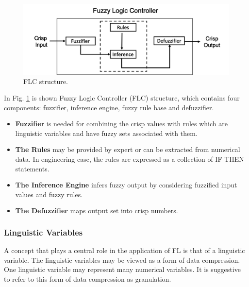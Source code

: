 \documentclass[graybox]{svmult}
\begin{document}
\begin{figure}[h]\centering
	\includegraphics[width=1.0\textwidth]{figure/fc.png}%
	\caption{FLC structure.}\label{fig:Fuzzy Control System}%
\end{figure}

In Fig. \ref{fig:Fuzzy Control System} is shown Fuzzy Logic Controller (FLC) structure, which contains four components: fuzzifier, inference engine, fuzzy rule base and defuzzifier. 
\begin{itemize}
\item \textbf{Fuzzifier} is needed for combining the crisp values with rules which are linguistic variables and have fuzzy sets associated with them.
\item \textbf{The Rules} may be provided by expert or can be extracted from numerical data. In engineering case, the rules are expressed as a collection of IF-THEN statements. 
\item \textbf{The Inference Engine} infers fuzzy output by considering fuzzified input values and fuzzy rules.
\item \textbf{The Defuzzifier} maps output set into crisp numbers.
\end{itemize}




\subsubsection{Linguistic Variables}
A concept that plays a central role in 
the application of FL
is that of a linguistic variable. The linguistic variables 
may be viewed
as a form of data compression. One linguistic variable may represent many numerical variables. 
It is suggestive to refer to this form of data compression as granulation.
\end{document}
